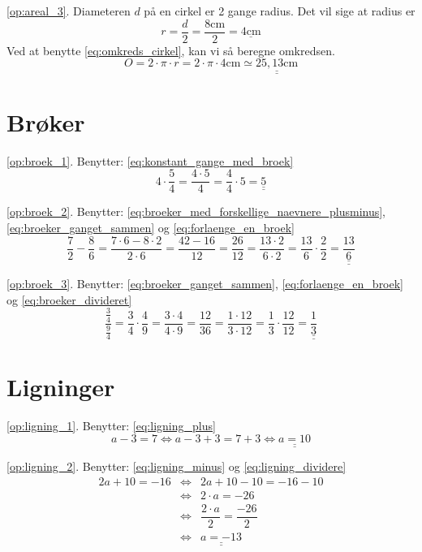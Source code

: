 \documentclass[11pt,a5paper,fleqn,leqno]{book}
\begin{document}
\ref{op:areal_3}. Diameteren $d$ på en cirkel er 2 gange radius. Det vil sige at radius er
\[r = \frac{d}{2} = \frac{8\text{cm}}{2} = \underline{4\text{cm}}\]
Ved at benytte \eqref{eq:omkreds_cirkel}, kan vi så beregne omkredsen.
\[O = 2 \cdot \pi \cdot r = 2 \cdot \pi \cdot 4\text{cm} \simeq \underline{\underline{25,13\text{cm}}}\]

\section{Brøker}

\ref{op:broek_1}. Benytter: \eqref{eq:konstant_gange_med_broek}
\[4 \cdot \frac{5}{4} = \frac{4 \cdot 5}{4} = \frac{4}{4} \cdot 5 = \underline{\underline{5}}\]

\ref{op:broek_2}. Benytter: \eqref{eq:broeker_med_forskellige_naevnere_plusminus}, \eqref{eq:broeker_ganget_sammen} og \eqref{eq:forlaenge_en_broek}
\[\frac{7}{2} - \frac{8}{6} = \frac{7 \cdot 6 - 8 \cdot 2}{2 \cdot 6} = \frac{42 - 16}{12} = \frac{26}{12} = \frac{13 \cdot 2}{6 \cdot 2} = \frac{13}{6} \cdot \frac{2}{2} = \underline{\underline{\frac{13}{6}}}\]

\ref{op:broek_3}. Benytter: \eqref{eq:broeker_ganget_sammen}, \eqref{eq:forlaenge_en_broek} og \eqref{eq:broeker_divideret}
\[\frac{\frac{3}{4}}{\frac{9}{4}} = \frac{3}{4} \cdot \frac{4}{9} = \frac{3 \cdot 4}{4 \cdot 9} = \frac{12}{36} = \frac{1 \cdot 12}{3 \cdot 12} = \frac{1}{3} \cdot \frac{12}{12} = \underline{\underline{\frac{1}{3}}}\]

\section{Ligninger}

\ref{op:ligning_1}. Benytter: \eqref{eq:ligning_plus}
\[a-3=7 \Leftrightarrow a-3+3=7+3 \Leftrightarrow \underline{\underline{a = 10}}\]

\ref{op:ligning_2}. Benytter: \eqref{eq:ligning_minus} og \eqref{eq:ligning_dividere}
\begin{displaymath}\begin{array}{rcl}
2a+10=-16 & \Leftrightarrow & 2a+10-10=-16-10 \\
          & \Leftrightarrow & 2 \cdot a = -26 \\
          & \Leftrightarrow & \dfrac{2 \cdot a}{2} = \dfrac{-26}{2} \\
          & \Leftrightarrow & \underline{\underline{a = -13}}
\end{array}\end{displaymath}
\end{document}
